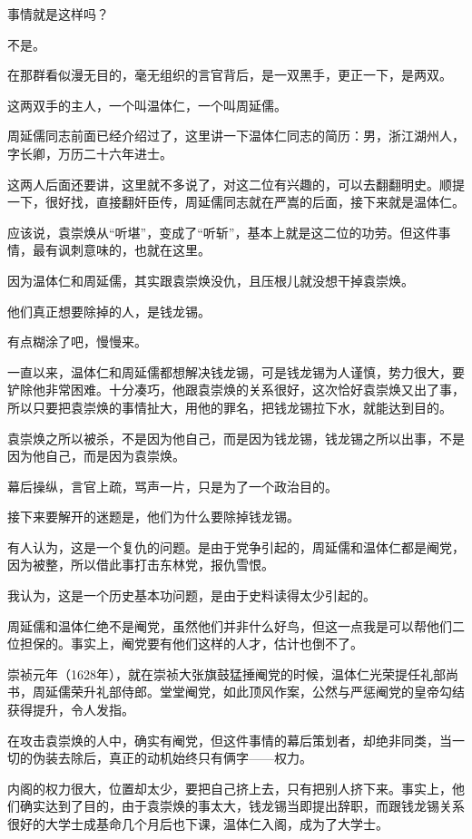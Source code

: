 \begin{multicols}{\theparacolNo}
事情就是这样吗？

不是。

在那群看似漫无目的，毫无组织的言官背后，是一双黑手，更正一下，是两双。

这两双手的主人，一个叫温体仁，一个叫周延儒。

周延儒同志前面已经介绍过了，这里讲一下温体仁同志的简历：男，浙江湖州人，字长卿，万历二十六年进士。

这两人后面还要讲，这里就不多说了，对这二位有兴趣的，可以去翻翻明史。顺提一下，很好找，直接翻奸臣传，周延儒同志就在严嵩的后面，接下来就是温体仁。

应该说，袁崇焕从“听堪”，变成了“听斩”，基本上就是这二位的功劳。但这件事情，最有讽刺意味的，也就在这里。

因为温体仁和周延儒，其实跟袁崇焕没仇，且压根儿就没想干掉袁崇焕。

他们真正想要除掉的人，是钱龙锡。

有点糊涂了吧，慢慢来。

一直以来，温体仁和周延儒都想解决钱龙锡，可是钱龙锡为人谨慎，势力很大，要铲除他非常困难。十分凑巧，他跟袁崇焕的关系很好，这次恰好袁崇焕又出了事，所以只要把袁崇焕的事情扯大，用他的罪名，把钱龙锡拉下水，就能达到目的。

袁崇焕之所以被杀，不是因为他自己，而是因为钱龙锡，钱龙锡之所以出事，不是因为他自己，而是因为袁崇焕。

幕后操纵，言官上疏，骂声一片，只是为了一个政治目的。

接下来要解开的迷题是，他们为什么要除掉钱龙锡。

有人认为，这是一个复仇的问题。是由于党争引起的，周延儒和温体仁都是阉党，因为被整，所以借此事打击东林党，报仇雪恨。

我认为，这是一个历史基本功问题，是由于史料读得太少引起的。

周延儒和温体仁绝不是阉党，虽然他们并非什么好鸟，但这一点我是可以帮他们二位担保的。事实上，阉党要有他们这样的人才，估计也倒不了。

崇祯元年（1628年），就在崇祯大张旗鼓猛捶阉党的时候，温体仁光荣提任礼部尚书，周延儒荣升礼部侍郎。堂堂阉党，如此顶风作案，公然与严惩阉党的皇帝勾结获得提升，令人发指。

在攻击袁崇焕的人中，确实有阉党，但这件事情的幕后策划者，却绝非同类，当一切的伪装去除后，真正的动机始终只有俩字——权力。

内阁的权力很大，位置却太少，要把自己挤上去，只有把别人挤下来。事实上，他们确实达到了目的，由于袁崇焕的事太大，钱龙锡当即提出辞职，而跟钱龙锡关系很好的大学士成基命几个月后也下课，温体仁入阁，成为了大学士。


\end{multicols}
